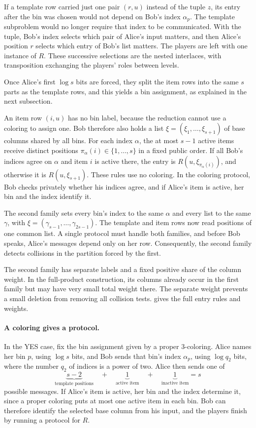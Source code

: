 \documentclass[11pt,letterpaper]{article} \usepackage[utf8]{inputenc}
\theoremstyle{plain} \newtheorem{theorem}{Theorem}[section]
\theoremstyle{definition} \newaliascnt{definition}{theorem}
\begin{document}
If a template row carried just one pair $(r,u)$ instead of the tuple $z$,
its entry after the bin was chosen would not depend on Bob's
index $\alpha_p$. The template subproblem would no longer require that
index to be communicated. With the tuple, Bob's index selects which pair
of Alice's input matters, and then Alice's position $r$ selects which entry
of Bob's list matters. The
players are left with one instance of $R$. These successive selections
are the nested interlaces, with transposition exchanging the players'
roles between levels.

Once Alice's first $\log s$ bits are forced, they split the item rows into
the same $s$ parts as the template rows, and this yields a bin assignment,
as explained in the next subsection.

An item row $(i,u)$ has no bin label, because the reduction cannot use a
coloring to assign one. Bob therefore also holds a list
$\xi=(\xi_1,\ldots,\xi_{s+1})$ of base columns shared by all bins. For each
index $\alpha$, the at most $s-1$ active items receive distinct positions
$\pi_\alpha(i)\in\{1,\ldots,s\}$ in a fixed public order.
If all Bob's indices agree on $\alpha$ and item $i$ is active there,
the entry is $R(u,\xi_{\pi_\alpha(i)})$, and otherwise it is
$R(u,\xi_{s+1})$. These rules use no coloring. In the coloring protocol,
Bob checks privately whether his indices agree, and if Alice's item is
active, her bin and the index identify it.

The second family sets every bin's index to the same $\alpha$ and every
list to the same $\gamma$, with
$\xi=(\gamma_{s-1},\ldots,\gamma_{2s-1})$.
The template and item rows now read positions of one common list.
A single protocol must handle both families, and before Bob speaks,
Alice's messages depend only on her row. Consequently, the second family
detects collisions in the partition forced by the first.

The second family has separate labels and a fixed positive share of
the column weight. In the full-product construction, its columns
already occur in the first family but may have very small total
weight there. The separate weight prevents a small deletion from
removing all collision tests.  gives the full
entry rules and weights.

\paragraph{A coloring gives a protocol.}
In the YES case, fix the bin assignment given by a proper $3$-coloring.
Alice names her bin $p$, using $\log s$ bits, and Bob sends that bin's index $\alpha_p$,
using $\log q_2$ bits, where the number $q_2$ of indices is a power of two.
Alice then sends one of
\[
\underbrace{s-2}_{\text{template positions}}
\quad+\quad
\underbrace{1}_{\text{active item}}
\quad+\quad
\underbrace{1}_{\text{inactive item}}
=s
\]
possible messages. If Alice's item is active, her bin and the index
determine it, since a proper coloring puts at most one active item in each
bin. Bob can therefore identify the selected base column from his input,
and the players finish by running a protocol for $R$.
\end{document}
